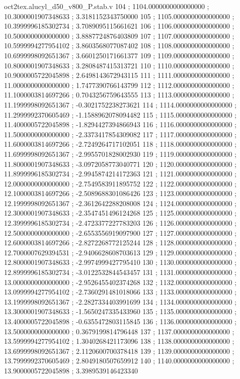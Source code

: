 \begin{filecontents}[overwrite]{oct2tex.alucyl_d50_v800_P.stab.v}
104 ; 1104.0000000000000000 ; 10.3000001907348633 ; 3.3181152343750000
105 ; 1105.0000000000000000 ; 10.3999996185302734 ; 3.7089095115661621
106 ; 1106.0000000000000000 ; 10.5000000000000000 ; 3.8887724876403809
107 ; 1107.0000000000000000 ; 10.5999994277954102 ; 3.8603568077087402
108 ; 1108.0000000000000000 ; 10.6999998092651367 ; 3.6601250171661377
109 ; 1109.0000000000000000 ; 10.8000001907348633 ; 3.2808487415313721
110 ; 1110.0000000000000000 ; 10.9000005722045898 ; 2.6498143672943115
111 ; 1111.0000000000000000 ; 11.0000000000000000 ; 1.7477390766143799
112 ; 1112.0000000000000000 ; 11.1000003814697266 ; 0.7043256759643555
113 ; 1113.0000000000000000 ; 11.1999998092651367 ; -0.3021752238273621
114 ; 1114.0000000000000000 ; 11.2999992370605469 ; -1.1588962078094482
115 ; 1115.0000000000000000 ; 11.4000005722045898 ; -1.8294427394866943
116 ; 1116.0000000000000000 ; 11.5000000000000000 ; -2.3373417854309082
117 ; 1117.0000000000000000 ; 11.6000003814697266 ; -2.7249264717102051
118 ; 1118.0000000000000000 ; 11.6999998092651367 ; -2.9955701828002930
119 ; 1119.0000000000000000 ; 11.8000001907348633 ; -3.0972058773040771
120 ; 1120.0000000000000000 ; 11.8999996185302734 ; -2.9945874214172363
121 ; 1121.0000000000000000 ; 12.0000000000000000 ; -2.7549583911895752
122 ; 1122.0000000000000000 ; 12.1000003814697266 ; -2.5089688301086426
123 ; 1123.0000000000000000 ; 12.1999998092651367 ; -2.3612642288208008
124 ; 1124.0000000000000000 ; 12.3000001907348633 ; -2.3547451496124268
125 ; 1125.0000000000000000 ; 12.3999996185302734 ; -2.4723377227783203
126 ; 1126.0000000000000000 ; 12.5000000000000000 ; -2.6553556919097900
127 ; 1127.0000000000000000 ; 12.6000003814697266 ; -2.8272268772125244
128 ; 1128.0000000000000000 ; 12.7000007629394531 ; -2.9406628608703613
129 ; 1129.0000000000000000 ; 12.8000001907348633 ; -2.9974999427795410
130 ; 1130.0000000000000000 ; 12.8999996185302734 ; -3.0122532844543457
131 ; 1131.0000000000000000 ; 13.0000000000000000 ; -2.9526455402374268
132 ; 1132.0000000000000000 ; 13.0999994277954102 ; -2.7360291481018066
133 ; 1133.0000000000000000 ; 13.1999998092651367 ; -2.2827334403991699
134 ; 1134.0000000000000000 ; 13.3000001907348633 ; -1.5650247335433960
135 ; 1135.0000000000000000 ; 13.4000005722045898 ; -0.6355472803115845
136 ; 1136.0000000000000000 ; 13.5000000000000000 ; 0.3679199814796448
137 ; 1137.0000000000000000 ; 13.5999994277954102 ; 1.3040268421173096
138 ; 1138.0000000000000000 ; 13.6999998092651367 ; 2.1120600700378418
139 ; 1139.0000000000000000 ; 13.7999992370605469 ; 2.8049180507659912
140 ; 1140.0000000000000000 ; 13.9000005722045898 ; 3.3989539146423340

\end{filecontents}
